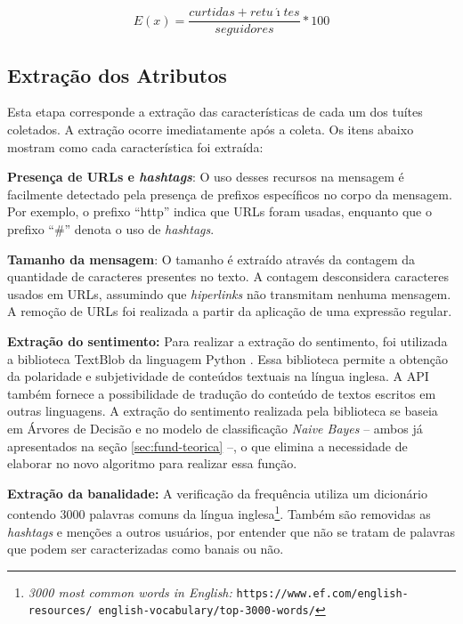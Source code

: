 \documentclass[oneside,openright,12pt]{ufsm_2015} %
\begin{document}
    \begin{equation} \label{eq:engajamento-api}
    E(x) = \frac{curtidas + retu\acute{\imath}tes}{seguidores}*100
    \end{equation}


\subsection{Extração dos Atributos}
\label{sec:prop-extracao}

    \par Esta etapa corresponde a extração das características de cada um dos tuítes coletados. A extração ocorre imediatamente após a coleta. Os itens abaixo mostram como cada característica foi extraída:
    
    \par \textbf{Presença de URLs e \textit{hashtags}}: O uso desses recursos na mensagem é facilmente detectado pela presença de prefixos específicos no corpo da mensagem. Por exemplo, o prefixo ``http'' indica que URLs foram usadas, enquanto que o prefixo ``\#'' denota o uso de \textit{hashtags}. 
    
    \par \textbf{Tamanho da mensagem}: O tamanho é extraído através da contagem da quantidade de caracteres presentes no texto. A contagem desconsidera caracteres usados em URLs, assumindo que \textit{hiperlinks} não transmitam nenhuma mensagem.  A remoção de URLs foi realizada a partir da aplicação de uma expressão regular.

    \par \textbf{Extração do sentimento:} Para realizar a extração do sentimento, foi utilizada a biblioteca TextBlob da linguagem Python \cite{loria:14}. Essa biblioteca  permite a obtenção da polaridade e subjetividade de conteúdos textuais na língua inglesa. A API também fornece a possibilidade de tradução do conteúdo de textos escritos em outras linguagens. A extração do sentimento realizada pela biblioteca se baseia em Árvores de Decisão e no modelo de classificação \textit{Naive Bayes} -- ambos já apresentados na seção \ref{sec:fund-teorica} --, o que elimina a necessidade de elaborar no novo algoritmo para realizar essa função. 

    \par \textbf{Extração da banalidade:} A verificação da frequência utiliza um dicionário contendo 3000 palavras comuns da língua inglesa\footnote{\textit{3000 most common words in English: }\texttt{https://www.ef.com/english-resources/ english-vocabulary/top-3000-words/}}. Também são removidas as \textit{hashtags} e menções a outros usuários, por entender que não se tratam de palavras que podem ser caracterizadas como banais ou não.
    
\end{document}
